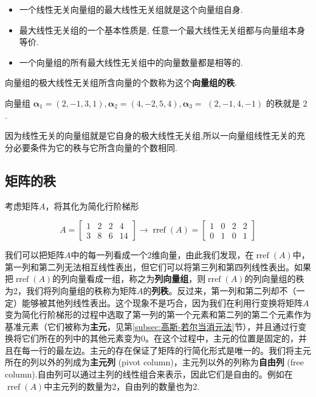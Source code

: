 
\begin{proposition}
    \begin{itemize}
    \item 一个线性无关向量组的最大线性无关组就是这个向量组自身.
    \item 最大线性无关组的一个基本性质是, 任意一个最大线性无关组都与向量组本身等价.
    \item 一个向量组的所有最大线性无关组中的向量数量都是相等的.
\end{itemize}
\end{proposition}

\begin{definition}[向量组的秩]
    向量组的极大线性无关组所含向量的个数称为这个\textcolor{third}{\bf 向量组的秩}.
\end{definition}

\begin{exercise}
    向量组 $\boldsymbol{\alpha}_1=(2,-1,3,1), \boldsymbol{\alpha}_2=(4,-2,5,4), \boldsymbol{\alpha}_3=$ $(2,-1,4,-1)$ 的秩就是 2 .
\end{exercise}

因为线性无关的向量组就是它自身的极大线性无关组,所以一向量组线性无关的充分必要条件为它的秩与它所含向量的个数相同.

\subsection{矩阵的秩}
\label{subsec:矩阵的秩}                    

考虑矩阵$A$，将其化为简化行阶梯形

\begin{equation*}
A=\left[\begin{array}{rrrr}
1 & 2 & 2 & 4 \\
3 & 8 & 6 & 14
\end{array}\right]    
\longrightarrow
\operatorname{rref}(A)=\left[\begin{array}{llll}
1 & 0 & 2 & 2 \\
0 & 1 & 0 & 1
\end{array}\right]
\label{eq:矩阵的秩例子1}
\end{equation*}

我们可以把矩阵$A$中的每一列看成一个2维向量，由此我们发现，在$\operatorname{rref}(A)$中，第一列和第二列无法相互线性表出，但它们可以将第三列和第四列线性表出。如果把$\operatorname{rref}(A)$的列向量看成一组，称之为\textcolor{third}{\bf 列向量组}，则$\operatorname{rref}(A)$的列向量组的秩为2，我们将列向量组的秩称为矩阵$A$的\textcolor{third}{\bf 列秩}。反过来，第一列和第二列却不（一定）能够被其他列线性表出。这个现象不是巧合，因为我们在利用行变换将矩阵$A$变为简化行阶梯形的过程中选取了第一列的第一个元素和第二列的第二个元素作为基准元素（它们被称为\textcolor{third}{\bf 主元}，见第\ref{subsec:高斯-若尔当消元法}节），并且通过行变换将它们所在的列中的其他元素变为0。在这个过程中，主元的位置是固定的，并且在每一行的最左边。主元的存在保证了矩阵的行简化形式是唯一的。我们将主元所在的列以外的列成为\textcolor{third}{\bf 主元列} (pivot column)，主元列以外的列称为\textcolor{third}{\bf 自由列} (free column).自由列可以通过主列的线性组合来表示，因此它们是自由的。例如在$\operatorname{rref}(A)$中主元列的数量为2，自由列的数量也为2.


